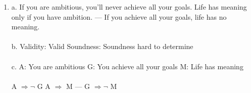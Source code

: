 \documentclass[]{article}
\begin{document}
\begin{enumerate}
    \item a.
    \newline If you are ambitious, you'll never achieve all your goals.
    \newline
    Life has meaning only if you have ambition.
    \newline
    ---
    \newline
    If you achieve all your goals, life has no meaning.
    \\\\b.
    Validity: Valid
    \newline
    Soundness: Soundness hard to determine
    \\\\c.
    \newline A: You are ambitious
    \newline G: You achieve all your goals
    \newline M: Life has meaning
    \\\\ A $\Rightarrow \neg$ G
    \newline A $\Rightarrow$ M
    \newline ---
    \newline G $\Rightarrow \neg$ M
    

\end{enumerate}
\end{document}
